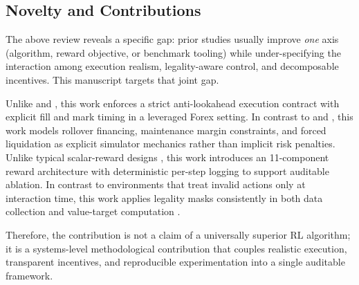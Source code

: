 \subsection{Novelty and Contributions}
The above review reveals a specific gap: prior studies usually improve \emph{one} axis (algorithm, reward objective, or benchmark tooling) while under-specifying the interaction among execution realism, legality-aware control, and decomposable incentives. This manuscript targets that joint gap.

Unlike \citet{deng2016deep} and \citet{theate2021application}, this work enforces a strict anti-lookahead execution contract with explicit fill and mark timing in a leveraged Forex setting. In contrast to \citet{carapuco2018reinforcement} and \citet{rundo2019deep}, this work models rollover financing, maintenance margin constraints, and forced liquidation as explicit simulator mechanics rather than implicit risk penalties. Unlike typical scalar-reward designs \citep{meng2019reinforcement,theate2021application}, this work introduces an 11-component reward architecture with deterministic per-step logging to support auditable ablation. In contrast to environments that treat invalid actions only at interaction time, this work applies legality masks consistently in both data collection and value-target computation \citep{huang2020closer}.

Therefore, the contribution is not a claim of a universally superior RL algorithm; it is a systems-level methodological contribution that couples realistic execution, transparent incentives, and reproducible experimentation into a single auditable framework.
